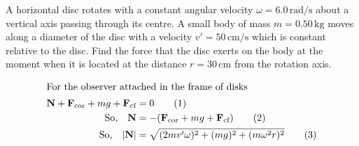 \item A horizontal disc rotates with a constant angular velocity \(\omega = 6.0 \, \text{rad/s}\) about a vertical axis passing through its centre. A small body of mass \(m = 0.50 \, \text{kg}\) moves along a diameter of the disc with a velocity \(v' = 50 \, \text{cm/s}\) which is constant relative to the disc. Find the force that the disc exerts on the body at the moment when it is located at the distance \(r = 30 \, \text{cm}\) from the rotation axis.
    \begin{center}
    \end{center}\begin{solution}
    \begin{align*}
        \intertext{For the observer attached in the frame of disks}
        \mathbf{N} + \mathbf{F}_{\text{cor}} + mg + \mathbf{F}_{\text{cf}} &= 0 \tag{1} \\
        \text{So,} \quad \mathbf{N} &= -(\mathbf{F}_{\text{cor}} + mg + \mathbf{F}_{\text{cf}}) \tag{2} \\
        \text{So,} \quad |\mathbf{N}| &= \sqrt{(2m v' \omega)^2 + (mg)^2 + (m\omega^2 r)^2} \tag{3}
    \end{align*}
\end{solution}